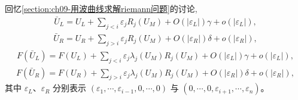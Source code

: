 \documentclass[../../main.tex]{subfiles}
\begin{document}
回忆\cref{section:ch09-用波曲线求解riemann问题}的讨论,
\begin{align}
\bar{U}_{L}=U_{L}+\sum_{j<i}\varepsilon_{j}R_{j}(U_{M})+O(|\varepsilon_{L}|)\gamma+o(|\varepsilon_{L}|),
\label{align:ch09-9-9-17}
\end{align}
\begin{align}
\bar{U}_{R}=U_{R}+\sum_{j>i}\varepsilon_{j}R_{j}(U_{M})+O(|\varepsilon_{R}|)\delta+o(|\varepsilon_{R}|),
\label{align:ch09-9-9-18}
\end{align}
\begin{align}
F(\bar{U}_{L})=F(U_{L})+\sum_{j<i}\varepsilon_{j}\lambda_{j}(U_{M})R_{j}(U_{M})+O(|\varepsilon_{L}|)\gamma+o(|\varepsilon_{L}|),
\label{align:ch09-9-9-19}
\end{align}
\begin{align}
F(\bar{U}_{R})=F(U_{R})+\sum_{j>i}\varepsilon_{j}\lambda_{j}(U_{M})R_{j}(U_{M})+O(|\varepsilon_{R}|)\delta+o(|\varepsilon_{R}|),
\label{align:ch09-9-9-20}
\end{align}
其中 $\varepsilon_{L}$、$\varepsilon_{R}$ 分别表示 $(\varepsilon_{1},\cdots ,\varepsilon_{i-1},0,\cdots ,0)$ 与 $(0,\cdots ,0,\varepsilon_{i+1},\cdots ,\varepsilon_{n})$。
\end{document}
